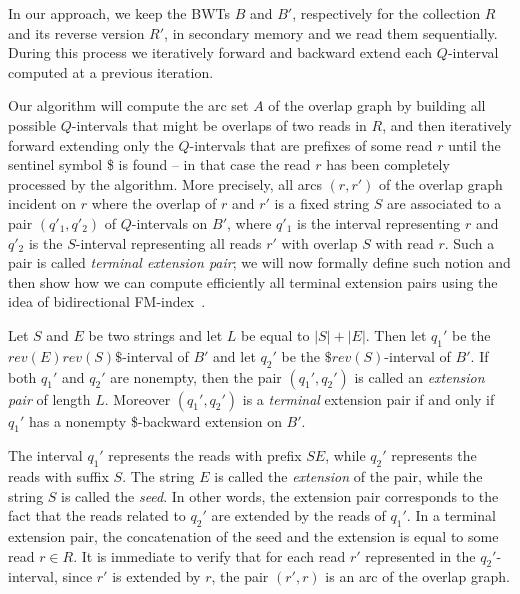 \documentclass[runningheads,envcountsame,a4paper]{llncs}
\begin{document}
In our approach, we keep the BWTs $B$  and  $B'$, respectively  for the collection $R$ and its
reverse version $R'$,  in secondary memory and we read them sequentially.
During this process we iteratively forward and backward extend each
$Q$-interval computed at a previous iteration.

Our algorithm  will compute the arc set $A$  of the overlap graph
by building all possible $Q$-intervals that might be overlaps of two
reads in $R$, and then iteratively forward extending only the $Q$-intervals that
are prefixes of some read $r$ until the sentinel symbol \$ is
found -- in that case the read $r$ has been completely processed by the algorithm.
More precisely,    all arcs    $(r,r')$ of the overlap graph incident on $r$ where the overlap of $r$ and $r'$ is a fixed string $S$ are  associated to a pair  $(q'_1, q'_2)$ of $Q$-intervals on $B'$,
where $q'_1$ is the interval  representing   $r$ and $q'_2$ is the  $S$-interval representing all reads
 $r'$ with overlap $S$ with read $r$. Such a pair is called {\em terminal
extension pair}; we will now  formally define such notion and then show how we
can compute efficiently all terminal extension pairs
using the idea of bidirectional FM-index~\cite{Lam2009}.

\begin{definition}\label{def:extension-pair}
Let $S$ and $E$ be two strings and let $L$ be equal to $|S|+|E|$.
Then let $q_{1}'$ be the $rev(E)rev(S)\$$-interval of $B'$ and let  $q_{2}'$ be the $\$rev(S)$-interval of $B'$.
If both $q_{1}'$ and  $q_{2}'$ are nonempty, then the pair  $(q_{1}', q_{2}')$ is called
an \emph{extension pair} of length $L$.
Moreover $(q_{1}', q_{2}')$ is a \emph{terminal} extension pair
if and only if $q_{1}'$ has a nonempty \$-backward extension on $B'$.
\end{definition}

The interval $q_{1}'$ represents   the reads with prefix $SE$, while $q_{2}'$
represents the reads with suffix $S$.
The  string $E$ is called the \emph{extension} of the
pair, while the string $S$ is called the \emph{seed}.
In other words, the extension pair corresponds to the fact that the reads related to $q_{2}'$ are extended by the reads
of $q_{1}'$.
In a terminal extension pair, the concatenation of the seed and the extension is
equal to some read $r \in R$.
It is immediate to verify  that for each read $r'$ represented in the $q_{2}'$-interval, since $r'$ is extended by $r$,
the pair $(r', r)$ is an arc of the overlap graph.
\end{document}
